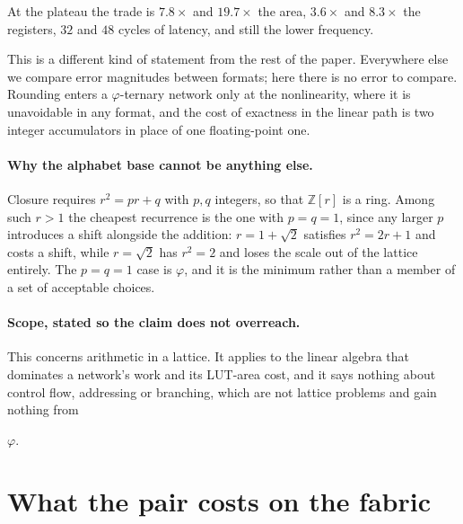 At the plateau the trade is $7.8\times$ and $19.7\times$ the area,
$3.6\times$ and $8.3\times$ the registers, $32$ and $48$ cycles of latency, and
still the lower frequency.


This is a different kind of statement from the rest of the paper. Everywhere else
we compare error magnitudes between formats; here there is no error to compare.
Rounding enters a $\varphi$-ternary network only at the nonlinearity, where it is
unavoidable in any format, and the cost of exactness in the linear path is two
integer accumulators in place of one floating-point one.

\paragraph{Why the alphabet base cannot be anything else.} Closure requires
$r^{2} = pr + q$ with $p,q$ integers, so that $\mathbb{Z}[r]$ is a ring. Among
such $r>1$ the cheapest recurrence is the one with $p=q=1$, since any larger $p$
introduces a shift alongside the addition: $r = 1+\sqrt2$ satisfies
$r^2 = 2r+1$ and costs a shift, while $r=\sqrt2$ has $r^2 = 2$ and loses the
scale out of the lattice entirely. The $p=q=1$ case is $\varphi$, and it is the
minimum rather than a member of a set of acceptable choices.

\paragraph{Scope, stated so the claim does not overreach.} This concerns
arithmetic in a lattice. It applies to the linear algebra that dominates a
network's work and its LUT-area cost, and it says nothing about control flow,
addressing or branching, which are not lattice problems and gain nothing from

$\varphi$.



\section{What the pair costs on the fabric}


